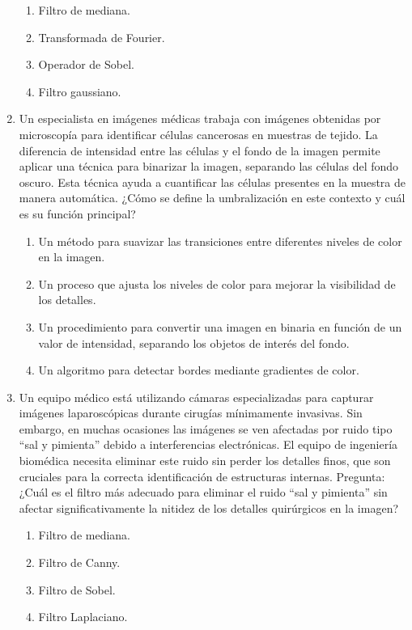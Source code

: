 \documentclass[12pt,a4paper]{article}
\providecommand{\tightlist}{%
  \setlength{\itemsep}{0pt}\setlength{\parskip}{0pt}}\usepackage{longtable,booktabs,array}
\providecommand{\tightlist}{%
  \setlength{\itemsep}{0pt}\setlength{\parskip}{2pt}}
\begin{document}
\begin{enumerate}
  \begin{enumerate}
  \tightlist
  \item
    Filtro de mediana.
  \item
    Transformada de Fourier.
  \item
    Operador de Sobel.
  \item
    Filtro gaussiano.
  \end{enumerate}
\item
  Un especialista en imágenes médicas trabaja con imágenes obtenidas por
  microscopía para identificar células cancerosas en muestras de tejido.
  La diferencia de intensidad entre las células y el fondo de la imagen
  permite aplicar una técnica para binarizar la imagen, separando las
  células del fondo oscuro. Esta técnica ayuda a cuantificar las células
  presentes en la muestra de manera automática. ¿Cómo se define la
  umbralización en este contexto y cuál es su función principal?

  \begin{enumerate}
  \tightlist
  \item
    Un método para suavizar las transiciones entre diferentes niveles de
    color en la imagen.
  \item
    Un proceso que ajusta los niveles de color para mejorar la
    visibilidad de los detalles.
  \item
    Un procedimiento para convertir una imagen en binaria en función de
    un valor de intensidad, separando los objetos de interés del fondo.
  \item
    Un algoritmo para detectar bordes mediante gradientes de color.
  \end{enumerate}
\item
  Un equipo médico está utilizando cámaras especializadas para capturar
  imágenes laparoscópicas durante cirugías mínimamente invasivas. Sin
  embargo, en muchas ocasiones las imágenes se ven afectadas por ruido
  tipo ``sal y pimienta'' debido a interferencias electrónicas. El
  equipo de ingeniería biomédica necesita eliminar este ruido sin perder
  los detalles finos, que son cruciales para la correcta identificación
  de estructuras internas. Pregunta: ¿Cuál es el filtro más adecuado
  para eliminar el ruido ``sal y pimienta'' sin afectar
  significativamente la nitidez de los detalles quirúrgicos en la
  imagen?

  \begin{enumerate}
  \tightlist
  \item
    Filtro de mediana.
  \item
    Filtro de Canny.
  \item
    Filtro de Sobel.
  \item
    Filtro Laplaciano.
  \end{enumerate}
\end{enumerate}
\end{document}
